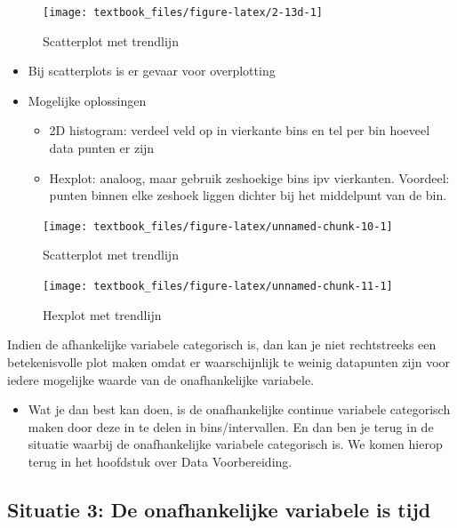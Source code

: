 \documentclass[]{tufte-book}
\providecommand{\tightlist}{%
  \setlength{\itemsep}{0pt}\setlength{\parskip}{0pt}}
\begin{document}
\begin{figure}
\texttt{[image: textbook\_files/figure-latex/2-13d-1]} \caption[Scatterplot met trendlijn]{Scatterplot met trendlijn}\label{fig:2-13d}
\end{figure}

\begin{itemize}
\tightlist
\item
  Bij scatterplots is er gevaar voor overplotting
\item
  Mogelijke oplossingen

  \begin{itemize}
  \tightlist
  \item
    2D histogram: verdeel veld op in vierkante bins en tel per bin hoeveel data punten er zijn
  \item
    Hexplot: analoog, maar gebruik zeshoekige bins ipv vierkanten. Voordeel: punten binnen elke zeshoek liggen dichter bij het middelpunt van de bin.
  \end{itemize}
\end{itemize}

\begin{figure}
\texttt{[image: textbook\_files/figure-latex/unnamed-chunk-10-1]} \caption[Scatterplot met trendlijn]{Scatterplot met trendlijn}\label{fig:unnamed-chunk-10}
\end{figure}

\begin{figure}
\texttt{[image: textbook\_files/figure-latex/unnamed-chunk-11-1]} \caption[Hexplot met trendlijn]{Hexplot met trendlijn}\label{fig:unnamed-chunk-11}
\end{figure}

Indien de afhankelijke variabele categorisch is, dan kan je niet rechtstreeks een betekenisvolle plot maken omdat er waarschijnlijk te weinig datapunten zijn voor iedere mogelijke waarde van de onafhankelijke variabele.

\begin{itemize}
\tightlist
\item
  Wat je dan best kan doen, is de onafhankelijke continue variabele categorisch maken door deze in te delen in bins/intervallen. En dan ben je terug in de situatie waarbij de onafhankelijke variabele categorisch is. We komen hierop terug in het hoofdstuk over Data Voorbereiding.
\end{itemize}

\hypertarget{situatie-3-de-onafhankelijke-variabele-is-tijd}{%
\subsection{Situatie 3: De onafhankelijke variabele is tijd}\label{situatie-3-de-onafhankelijke-variabele-is-tijd}}
\end{document}
